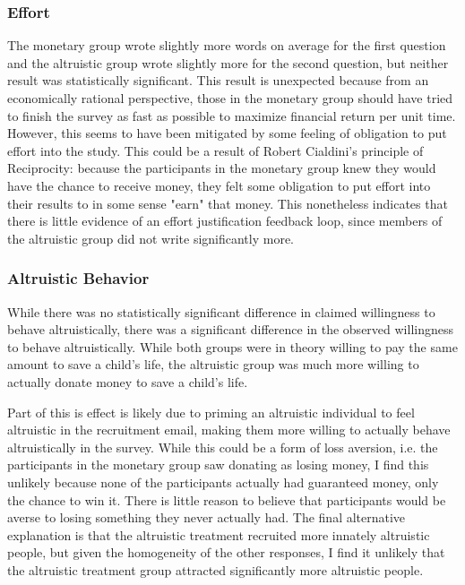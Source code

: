 \documentclass[12pt]{article}
\begin{document}
\subsubsection{Effort}
The monetary group wrote slightly more words on average for the first question and the altruistic group wrote slightly more for the second question, but neither result was statistically significant. This result is unexpected because from an economically rational perspective, those in the monetary group should have tried to finish the survey as fast as possible to maximize financial return per unit time. However, this seems to have been mitigated by some feeling of obligation to put effort into the study. This could be a result of Robert Cialdini's principle of Reciprocity: because the participants in the monetary group knew they would have the chance to receive money, they felt some obligation to put effort into their results to in some sense "earn" that money. This nonetheless indicates that there is little evidence of an effort justification feedback loop, since members of the altruistic group did not write significantly more. 

\subsubsection{Altruistic Behavior}
While there was no statistically significant difference in claimed willingness to behave altruistically, there was a significant difference in the observed willingness to behave altruistically. While both groups were in theory willing to pay the same amount to save a child's life, the altruistic group was much more willing to actually donate money to save a child's life. 

Part of this is effect is likely due to priming an altruistic individual to feel altruistic in the recruitment email, making them more willing to actually behave altruistically in the survey. While this could be a form of loss aversion, i.e. the participants in the monetary group saw donating as losing money, I find this unlikely because none of the participants actually had guaranteed money, only the chance to win it. There is little reason to believe that participants would be averse to losing something they never actually had. The final alternative explanation is that the altruistic treatment recruited more innately altruistic people, but given the homogeneity of the other responses, I find it unlikely that the altruistic treatment group attracted significantly more altruistic people. 
\end{document}
